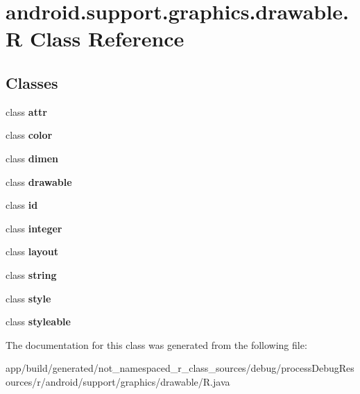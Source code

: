 \hypertarget{classandroid_1_1support_1_1graphics_1_1drawable_1_1_r}{}\section{android.\+support.\+graphics.\+drawable.\+R Class Reference}
\label{classandroid_1_1support_1_1graphics_1_1drawable_1_1_r}
\subsection*{Classes}
\begin{DoxyCompactItemize}
\item 
class {\bfseries attr}
\item 
class {\bfseries color}
\item 
class {\bfseries dimen}
\item 
class {\bfseries drawable}
\item 
class {\bfseries id}
\item 
class {\bfseries integer}
\item 
class {\bfseries layout}
\item 
class {\bfseries string}
\item 
class {\bfseries style}
\item 
class {\bfseries styleable}
\end{DoxyCompactItemize}


The documentation for this class was generated from the following file\+:\begin{DoxyCompactItemize}
\item 
app/build/generated/not\+\_\+namespaced\+\_\+r\+\_\+class\+\_\+sources/debug/process\+Debug\+Resources/r/android/support/graphics/drawable/R.\+java\end{DoxyCompactItemize}
